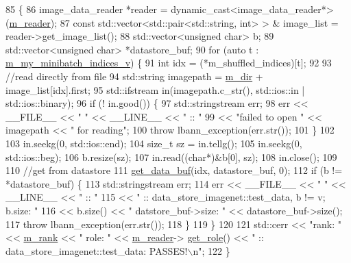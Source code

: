 \begin{DoxyCode}
85                                     \{
86   image\_data\_reader *reader = \textcolor{keyword}{dynamic\_cast<}image\_data\_reader*\textcolor{keyword}{>}(\hyperlink{classlbann_1_1generic__data__store_afa49ced0ab64c632371ea52532a91ec2}{m\_reader});
87   \textcolor{keyword}{const} std::vector<std::pair<std::string, int> > & image\_list = reader->get\_image\_list();
88   std::vector<unsigned char> b;
89   std::vector<unsigned char> *datastore\_buf;
90   \textcolor{keywordflow}{for} (\textcolor{keyword}{auto} t : \hyperlink{classlbann_1_1generic__data__store_a41f7fec1f1f3d6568a5765be7a6784eb}{m\_my\_minibatch\_indices\_v}) \{
91     \textcolor{keywordtype}{int} idx = (*m\_shuffled\_indices)[t];
92 
93     \textcolor{comment}{//read directly from file}
94     std::string imagepath = \hyperlink{classlbann_1_1generic__data__store_ab479c127f00ce550c7433b90e40a5a3d}{m\_dir} + image\_list[idx].first;
95     std::ifstream in(imagepath.c\_str(), std::ios::in | std::ios::binary);
96     \textcolor{keywordflow}{if} (! in.good()) \{
97       std::stringstream err;
98       err << \_\_FILE\_\_ << \textcolor{stringliteral}{" "} << \_\_LINE\_\_ << \textcolor{stringliteral}{" :: "}
99           << \textcolor{stringliteral}{"failed to open "} << imagepath << \textcolor{stringliteral}{" for reading"};
100       \textcolor{keywordflow}{throw} lbann\_exception(err.str());
101     \}
102 
103     in.seekg(0, std::ios::end);
104     \textcolor{keywordtype}{size\_t} sz = in.tellg();
105     in.seekg(0, std::ios::beg);
106     b.resize(sz);
107     in.read((\textcolor{keywordtype}{char}*)&b[0], sz);
108     in.close();
109 
110     \textcolor{comment}{//get from datastore}
111     \hyperlink{classlbann_1_1data__store__image_aa9e47fb3cad58dda4eaddcccc9bfa523}{get\_data\_buf}(idx, datastore\_buf, 0);
112     \textcolor{keywordflow}{if} (b != *datastore\_buf) \{
113       std::stringstream err;
114       err << \_\_FILE\_\_ << \textcolor{stringliteral}{" "} << \_\_LINE\_\_ << \textcolor{stringliteral}{" :: "}
115           << \textcolor{stringliteral}{" :: data\_store\_imagenet::test\_data, b != v; b.size: "} 
116           << b.size() << \textcolor{stringliteral}{"  datstore\_buf->size: "} << datastore\_buf->size();
117       \textcolor{keywordflow}{throw} lbann\_exception(err.str());
118     \} 
119   \}
120 
121   std::cerr << \textcolor{stringliteral}{"rank: "} << \hyperlink{classlbann_1_1generic__data__store_a87695bfd2d1ed0dbe01d99108e3f68b7}{m\_rank} << \textcolor{stringliteral}{" role: "} << \hyperlink{classlbann_1_1generic__data__store_afa49ced0ab64c632371ea52532a91ec2}{m\_reader}->
      \hyperlink{classlbann_1_1generic__data__reader_a92982e1b399f37e2ead5aa440883cba5}{get\_role}() << \textcolor{stringliteral}{" :: data\_store\_imagenet::test\_data: PASSES!\(\backslash\)n"};
122 \}
\end{DoxyCode}
